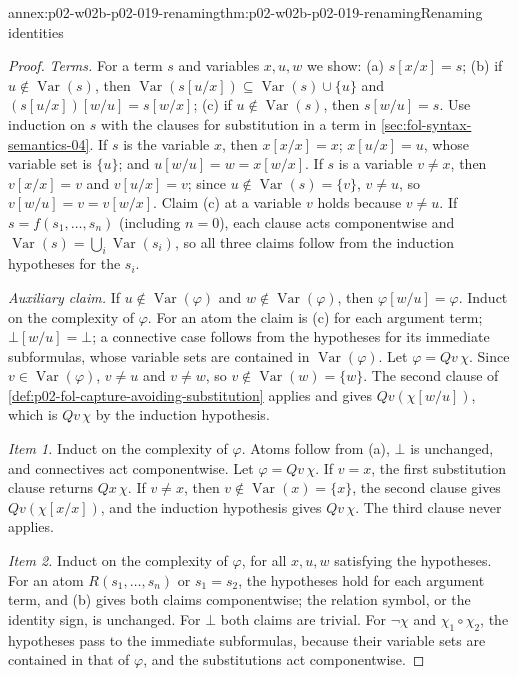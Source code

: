\begin{annexitem}{annex:p02-w02b-p02-019-renaming}{thm:p02-w02b-p02-019-renaming}{Renaming identities}
\begin{proof}
\emph{Terms.}  For a term \(s\) and variables \(x,u,w\) we show:
(a) \(s[x/x]=s\); (b) if \(u\notin\operatorname{Var}(s)\), then
\(\operatorname{Var}(s[u/x])\subseteq\operatorname{Var}(s)\cup\{u\}\) and
\((s[u/x])[w/u]=s[w/x]\); (c) if \(u\notin\operatorname{Var}(s)\), then
\(s[w/u]=s\).  Use induction on \(s\) with the clauses for substitution in a term in
\cref{sec:fol-syntax-semantics-04}.  If \(s\) is the variable \(x\), then
\(x[x/x]=x\); \(x[u/x]=u\), whose variable set is \(\{u\}\); and
\(u[w/u]=w=x[w/x]\).  If \(s\) is a variable \(v\ne x\), then
\(v[x/x]=v\) and \(v[u/x]=v\); since \(u\notin\operatorname{Var}(s)=\{v\}\),
\(v\ne u\), so \(v[w/u]=v=v[w/x]\).  Claim (c) at a variable \(v\) holds
because \(v\ne u\).  If \(s=f(s_1,\ldots,s_n)\) (including \(n=0\)), each
clause acts componentwise and
\(\operatorname{Var}(s)=\bigcup_i\operatorname{Var}(s_i)\), so all three
claims follow from the induction hypotheses for the \(s_i\).

\emph{Auxiliary claim.}  If \(u\notin\operatorname{Var}(\varphi)\) and
\(w\notin\operatorname{Var}(\varphi)\), then \(\varphi[w/u]=\varphi\).
Induct on the complexity of \(\varphi\).  For an atom the claim is (c) for
each argument term; \(\bot[w/u]=\bot\); a connective case follows from the
hypotheses for its immediate subformulas, whose variable sets are contained
in \(\operatorname{Var}(\varphi)\).  Let \(\varphi=Qv\,\chi\).  Since
\(v\in\operatorname{Var}(\varphi)\), \(v\ne u\) and \(v\ne w\), so
\(v\notin\operatorname{Var}(w)=\{w\}\).  The second clause of
\cref{def:p02-fol-capture-avoiding-substitution} applies and gives
\(Qv(\chi[w/u])\), which is \(Qv\,\chi\) by the induction hypothesis.

\emph{Item 1.}  Induct on the complexity of \(\varphi\).  Atoms follow from
(a), \(\bot\) is unchanged, and connectives act componentwise.  Let
\(\varphi=Qv\,\chi\).  If \(v=x\), the first substitution clause returns
\(Qx\,\chi\).  If \(v\ne x\), then \(v\notin\operatorname{Var}(x)=\{x\}\), the
second clause gives \(Qv(\chi[x/x])\), and the induction hypothesis gives
\(Qv\,\chi\).  The third clause never applies.

\emph{Item 2.}  Induct on the complexity of \(\varphi\), for all
\(x,u,w\) satisfying the hypotheses.  For an atom \(R(s_1,\ldots,s_n)\) or
\(s_1=s_2\), the hypotheses hold for each argument term, and (b) gives both
claims componentwise; the relation symbol, or the identity sign, is
unchanged.  For \(\bot\) both claims are trivial.  For \(\neg\chi\) and
\(\chi_1\circ\chi_2\), the hypotheses pass to the immediate subformulas,
because their variable sets are contained in that of \(\varphi\), and the
substitutions act componentwise.


\end{proof}
\end{annexitem}
